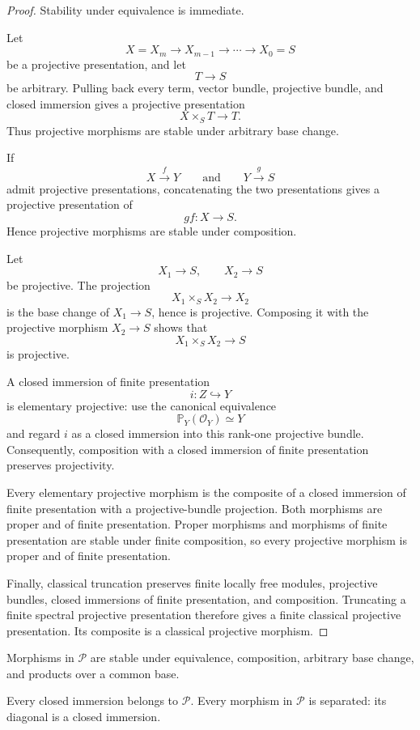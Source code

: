 \begin{proof}
Stability under equivalence is immediate.

Let
\[
    X=X_m
    \longrightarrow
    X_{m-1}
    \longrightarrow
    \cdots
    \longrightarrow
    X_0=S
\]
be a projective presentation, and let
\[
    T\longrightarrow S
\]
be arbitrary.  Pulling back every term, vector bundle, projective bundle, and
closed immersion gives a projective presentation
\[
    X\times_ST
    \longrightarrow
    T.
\]
Thus projective morphisms are stable under arbitrary base change.

If
\[
    X\xrightarrow{f}Y
    \qquad\text{and}\qquad
    Y\xrightarrow{g}S
\]
admit projective presentations, concatenating the two presentations gives a
projective presentation of
\[
    gf:X\longrightarrow S.
\]
Hence projective morphisms are stable under composition.

Let
\[
    X_1\longrightarrow S,
    \qquad
    X_2\longrightarrow S
\]
be projective.  The projection
\[
    X_1\times_SX_2
    \longrightarrow
    X_2
\]
is the base change of \(X_1\to S\), hence is projective.  Composing it with
the projective morphism \(X_2\to S\) shows that
\[
    X_1\times_SX_2
    \longrightarrow
    S
\]
is projective.

A closed immersion of finite presentation
\[
    i:Z\hookrightarrow Y
\]
is elementary projective: use the canonical equivalence
\[
    \mathbb P_Y(\mathcal O_Y)
    \simeq
    Y
\]
and regard \(i\) as a closed immersion into this rank-one projective bundle.
Consequently, composition with a closed immersion of finite presentation
preserves projectivity.

Every elementary projective morphism is the composite of a closed immersion
of finite presentation with a projective-bundle projection.  Both morphisms
are proper and of finite presentation.  Proper morphisms and morphisms of
finite presentation are stable under finite composition, so every projective
morphism is proper and of finite presentation.

Finally, classical truncation preserves finite locally free modules,
projective bundles, closed immersions of finite presentation, and
composition.  Truncating a finite spectral projective presentation therefore
gives a finite classical projective presentation.  Its composite is a
classical projective morphism.
\end{proof}

\begin{proposition}
\label{prop:proper-permanence}
Morphisms in \(\mathcal P\) are stable under equivalence, composition,
arbitrary base change, and products over a common base.

Every closed immersion belongs to \(\mathcal P\).  Every morphism in
\(\mathcal P\) is separated: its diagonal is a closed immersion.
\end{proposition}

